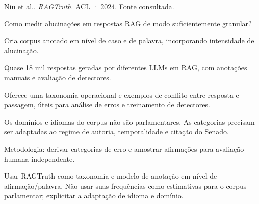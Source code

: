 {\small Niu et al.. \textit{RAGTruth}. ACL · 2024. \href{https://aclanthology.org/2024.acl-long.585/}{Fonte consultada}.\par}

Como medir alucinações em respostas RAG de modo suficientemente granular?

Cria corpus anotado em nível de caso e de palavra, incorporando intensidade de alucinação.

Quase 18 mil respostas geradas por diferentes LLMs em RAG, com anotações manuais e avaliação de detectores.

Oferece uma taxonomia operacional e exemplos de conflito entre resposta e passagem, úteis para análise de erros e treinamento de detectores.

\begin{itemize}
\end{itemize}

Os domínios e idiomas do corpus não são parlamentares. As categorias precisam ser adaptadas ao regime de autoria, temporalidade e citação do Senado.

Metodologia: derivar categorias de erro e amostrar afirmações para avaliação humana independente.

Usar RAGTruth como taxonomia e modelo de anotação em nível de afirmação/palavra. Não usar suas frequências como estimativas para o corpus parlamentar; explicitar a adaptação de idioma e domínio.

